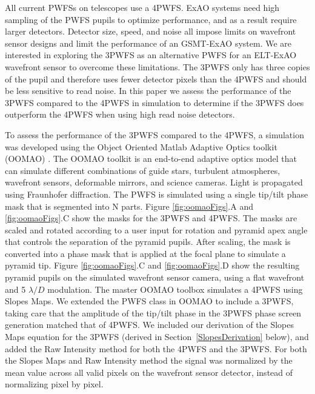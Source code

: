 All current PWFSs on telescopes use a 4PWFS. ExAO systems need high sampling of the PWFS pupils to optimize performance, and as a result require larger detectors. Detector size, speed, and noise all impose limits on wavefront sensor designs and limit the performance of an GSMT-ExAO system. We are interested in exploring the 3PWFS as an alternative PWFS for an ELT-ExAO wavefront sensor to overcome these limitations. The 3PWFS only has three copies of the pupil and therefore uses fewer detector pixels than the 4PWFS and should be less sensitive to read noise. In this paper we assess the performance of the 3PWFS compared to the 4PWFS in simulation to determine if the 3PWFS does outperform the 4PWFS when using high read noise detectors.

To assess the performance of the 3PWFS compared to the 4PWFS, a simulation was developed using the Object Oriented Matlab Adaptive Optics toolkit (OOMAO) \cite{OOMAO}. The OOMAO toolkit is an end-to-end adaptive optics model that can simulate different combinations of guide stars, turbulent atmospheres, wavefront sensors, deformable mirrors, and science cameras. Light is propagated using Fraunhofer diffraction. The PWFS is simulated using a single tip/tilt phase mask that is segmented into N parts. Figure \ref{fig:oomaoFigs}.A and \ref{fig:oomaoFigs}.C show the masks for the 3PWFS and 4PWFS. The masks are scaled and rotated according to a user input for rotation and pyramid apex angle that controls the separation of the pyramid pupils. After scaling, the mask is converted into a phase mask that is applied at the focal plane to simulate a pyramid tip. Figure \ref{fig:oomaoFigs}.C and \ref{fig:oomaoFigs}.D show the resulting pyramid pupils on the simulated wavefront sensor camera, using a flat wavefront and 5 $\lambda/D$ modulation. The master OOMAO toolbox simulates a 4PWFS using Slopes Maps. We extended the PWFS class in OOMAO to include a 3PWFS, taking care that the amplitude of the tip/tilt phase in the 3PWFS phase screen generation matched that of 4PWFS. We included our derivation of the Slopes Maps equation for the 3PWFS (derived in Section~\ref{SlopesDerivation} below), and added the Raw Intensity method for both the 4PWFS and the 3PWFS. For both the Slopes Maps and Raw Intensity method the signal was normalized by the mean value across all valid pixels on the wavefront sensor detector, instead of normalizing pixel by pixel. 

